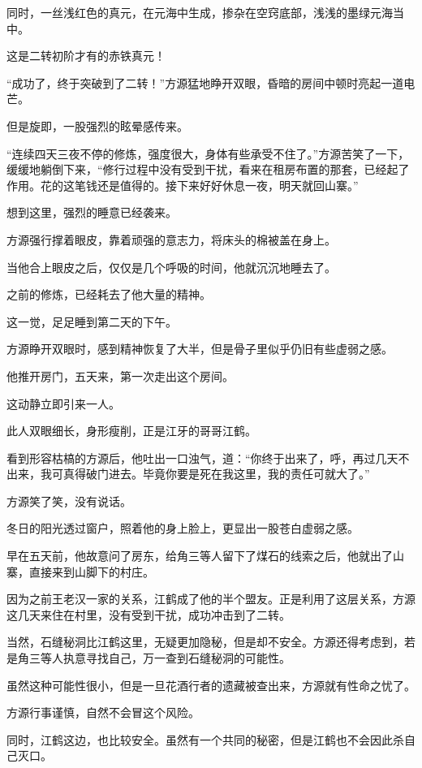 \begin{this_body}
同时，一丝浅红色的真元，在元海中生成，掺杂在空窍底部，浅浅的墨绿元海当中。

这是二转初阶才有的赤铁真元！

“成功了，终于突破到了二转！”方源猛地睁开双眼，昏暗的房间中顿时亮起一道电芒。

但是旋即，一股强烈的眩晕感传来。

“连续四天三夜不停的修炼，强度很大，身体有些承受不住了。”方源苦笑了一下，缓缓地躺倒下来，“修行过程中没有受到干扰，看来在租房布置的那套，已经起了作用。花的这笔钱还是值得的。接下来好好休息一夜，明天就回山寨。”

想到这里，强烈的睡意已经袭来。

方源强行撑着眼皮，靠着顽强的意志力，将床头的棉被盖在身上。

当他合上眼皮之后，仅仅是几个呼吸的时间，他就沉沉地睡去了。

之前的修炼，已经耗去了他大量的精神。

这一觉，足足睡到第二天的下午。

方源睁开双眼时，感到精神恢复了大半，但是骨子里似乎仍旧有些虚弱之感。

他推开房门，五天来，第一次走出这个房间。

这动静立即引来一人。

此人双眼细长，身形瘦削，正是江牙的哥哥江鹤。

看到形容枯槁的方源后，他吐出一口浊气，道：“你终于出来了，呼，再过几天不出来，我可真得破门进去。毕竟你要是死在我这里，我的责任可就大了。”

方源笑了笑，没有说话。

冬日的阳光透过窗户，照着他的身上脸上，更显出一股苍白虚弱之感。

早在五天前，他故意问了房东，给角三等人留下了煤石的线索之后，他就出了山寨，直接来到山脚下的村庄。

因为之前王老汉一家的关系，江鹤成了他的半个盟友。正是利用了这层关系，方源这几天来住在村里，没有受到干扰，成功冲击到了二转。

当然，石缝秘洞比江鹤这里，无疑更加隐秘，但是却不安全。方源还得考虑到，若是角三等人执意寻找自己，万一查到石缝秘洞的可能性。

虽然这种可能性很小，但是一旦花酒行者的遗藏被查出来，方源就有性命之忧了。

方源行事谨慎，自然不会冒这个风险。

同时，江鹤这边，也比较安全。虽然有一个共同的秘密，但是江鹤也不会因此杀自己灭口。


\end{this_body}
